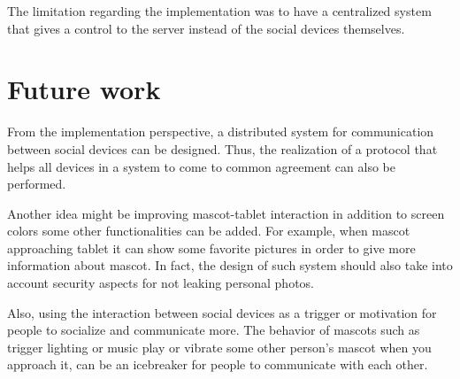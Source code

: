 The limitation regarding the implementation was to have a centralized system that gives a
control to the server instead of the social devices themselves.

\section{Future work}
\label{sec:future-work}
From the implementation perspective, a distributed system for communication between
social devices can be designed.
Thus, the realization of a protocol that helps all devices in a system to come to
common agreement can also be performed.

Another idea might be improving mascot-tablet interaction in addition to screen colors
some other functionalities can be added.
For example, when mascot approaching tablet it can show some favorite pictures in order
to give more information about mascot.
In fact, the design of such system should also take into account security aspects for not leaking personal photos.

Also, using the interaction between social devices as a trigger or
motivation for people to socialize and communicate more.
The behavior of mascots such as trigger lighting or music play or vibrate some other
person’s mascot when you approach it, can be an icebreaker for people to communicate with each other.